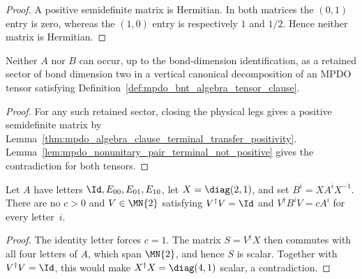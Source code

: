 \begin{proof}\leanok
    A positive semidefinite matrix is Hermitian. In both matrices the
    $(0,1)$ entry is zero, whereas the $(1,0)$ entry is respectively $1$ and
    $1/2$. Hence neither matrix is Hermitian.
\end{proof}

\begin{lemma}%
    \label{thm:mpdo_nonunitary_pair_not_retained_positive_sector}
    \leanok
    Neither $A$ nor $B$ can occur, up to the bond-dimension identification,
    as a retained sector of bond dimension two in a vertical canonical
    decomposition of an MPDO tensor satisfying
    Definition~\ref{def:mpdo_bnt_algebra_tensor_clause}.
\end{lemma}

\begin{proof}\leanok
    For any such retained sector, closing the physical legs gives a positive
    semidefinite matrix by
    Lemma~\ref{thm:mpdo_algebra_clause_terminal_transfer_positivity}.
    Lemma~\ref{lem:mpdo_nonunitary_pair_terminal_not_positive} gives the
    contradiction for both tensors.
\end{proof}

\begin{lemma}%
    \label{lem:mpdo_nonunitary_pair_no_positive_isometric_realization}
    \leanok
    Let $A$ have letters $\Id,E_{00},E_{01},E_{10}$, let
    $X=\diag(2,1)$, and set $B^i=XA^iX^{-1}$. There are no $c>0$ and
    $V\in\MN{2}$ satisfying $V^\dagger V=\Id$ and
    $V^\dagger B^iV=cA^i$ for every letter~$i$.
\end{lemma}

\begin{proof}\leanok
    The identity letter forces $c=1$. The matrix $S=V^\dagger X$ then
    commutes with all four letters of $A$, which span $\MN{2}$, and hence
    $S$ is scalar. Together with $V^\dagger V=\Id$, this would make
    $X^\dagger X=\diag(4,1)$ scalar, a contradiction.
\end{proof}

